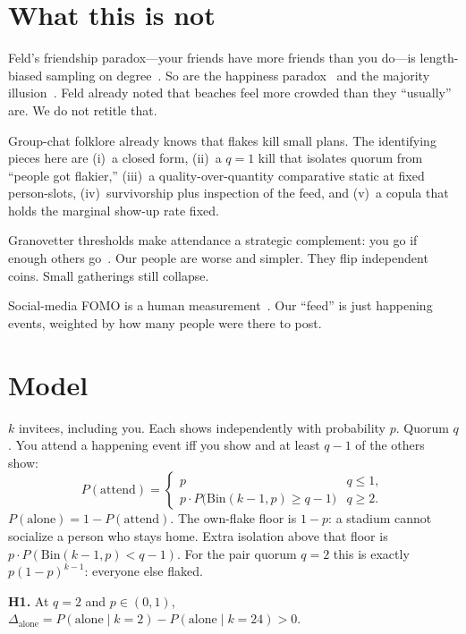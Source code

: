 \documentclass[10pt,twocolumn]{article}
\begin{document}
\section{What this is not}

Feld's friendship paradox---your friends have more friends than you
do---is length-biased sampling on
degree~\cite{feld1991friends,jackson2019friendship}. So are the happiness
paradox~\cite{bollen2017happiness} and the majority
illusion~\cite{lerman2016majority}. Feld already noted that beaches feel
more crowded than they ``usually'' are. We do not retitle that.

Group-chat folklore already knows that flakes kill small plans. The
identifying pieces here are (i)~a closed form,
(ii)~a $q=1$ kill that isolates quorum from ``people got flakier,''
(iii)~a quality-over-quantity comparative static at fixed person-slots,
(iv)~survivorship plus inspection of the feed, and (v)~a copula that
holds the marginal show-up rate fixed.

Granovetter thresholds make attendance a strategic complement: you go if
enough others go~\cite{granovetter1978threshold}. Our people are worse
and simpler. They flip independent coins. Small gatherings still collapse.

Social-media FOMO is a human measurement~\cite{hunt2018fomo}. Our ``feed''
is just happening events, weighted by how many people were there to post.

\section{Model}

$k$ invitees, including you. Each shows independently with probability
$p$. Quorum $q$. You attend a happening event iff you show and at least
$q-1$ of the others show:
\begin{equation}
  P(\mathrm{attend})=
  \begin{cases}
    p & q\le 1,\\
    p\cdot P\bigl(\mathrm{Bin}(k-1,p)\ge q-1\bigr) & q\ge 2.
  \end{cases}
\end{equation}
$P(\mathrm{alone})=1-P(\mathrm{attend})$. The own-flake floor is $1-p$:
a stadium cannot socialize a person who stays home. Extra isolation above
that floor is $p\cdot P(\mathrm{Bin}(k-1,p)<q-1)$. For the pair quorum
$q=2$ this is exactly $p(1-p)^{k-1}$: everyone else flaked.

\textbf{H1.} At $q=2$ and $p\in(0,1)$,
$\Delta_{\mathrm{alone}}=P(\mathrm{alone}\mid k=2)-P(\mathrm{alone}\mid k=24)>0$.
\end{document}
